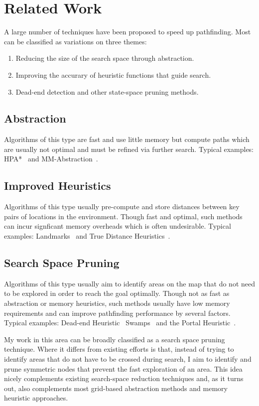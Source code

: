 \chapter{Related Work}
\label{cha:related}

A large number of techniques have been proposed to speed up pathfinding. Most
can be classified as variations on three themes:
\begin{enumerate}
\item{Reducing the size of the search space through abstraction.}
\item{Improving the accurary of heuristic functions that guide search.}
\item{Dead-end detection and other state-space pruning methods. }
\end{enumerate}

\section{Abstraction}
\label{cha:related:abs}
Algorithms of this type are fast and use little memory but compute paths which are usually not
optimal and must be refined via further search. Typical examples: HPA*~\cite{botea04} and
MM-Abstraction~\cite{sturtevant07}.

\section{Improved Heuristics}
\label{cha:related:heuristics}
Algorithms of this type usually pre-compute and store distances between key pairs of locations
in the environment. Though fast and optimal, such methods can incur signficant
memory overheads which is often undesirable. Typical examples: Landmarks~\cite{goldberg05} and
True Distance Heuristics~\cite{sturtevant09}.

\section{Search Space Pruning}
\label{char:related:pruning}
Algorithms of this type usually aim to identify areas on the map that do not need to be explored in
order to reach the goal optimally. Though not as fast as abstraction or memory
heuristics, such methods usually have low memory requirements and can improve
pathfinding performance by several factors. Typical examples: Dead-end Heuristic~\cite{bjornsson06}
Swamps~\cite{pochter09} and the Portal Heuristic~\cite{goldenberg10}.

My work in this area can be broadly classified as a search space pruning
technique. Where it differs from existing efforts is that, instead of trying to
identify areas that do not have to be crossed during search, I aim to identify
and prune symmetric nodes that prevent the fast exploration of an area. This
idea nicely complements existing search-space reduction techniques and, as it
turns out, also complements most grid-based abstraction methods and memory
heuristic approaches.
